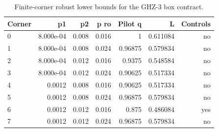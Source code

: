 \begin{table}[t]
\centering
\caption{Finite-corner robust lower bounds for the GHZ-3 box contract.}
\label{tab:noise-corners}
\begin{tabular}{lrrrrrr}
\hline
Corner & p1 & p2 & p ro & Pilot q & L & Controls \\
\hline
0 & 8.000e-04 & 0.008 & 0.016 & 1 & 0.611084 & no \\
1 & 8.000e-04 & 0.008 & 0.024 & 0.96875 & 0.579834 & no \\
2 & 8.000e-04 & 0.012 & 0.016 & 0.9375 & 0.548584 & no \\
3 & 8.000e-04 & 0.012 & 0.024 & 0.90625 & 0.517334 & no \\
4 & 0.0012 & 0.008 & 0.016 & 0.90625 & 0.517334 & no \\
5 & 0.0012 & 0.008 & 0.024 & 0.96875 & 0.579834 & no \\
6 & 0.0012 & 0.012 & 0.016 & 0.875 & 0.486084 & yes \\
7 & 0.0012 & 0.012 & 0.024 & 0.96875 & 0.579834 & no \\
\hline
\end{tabular}
\end{table}
